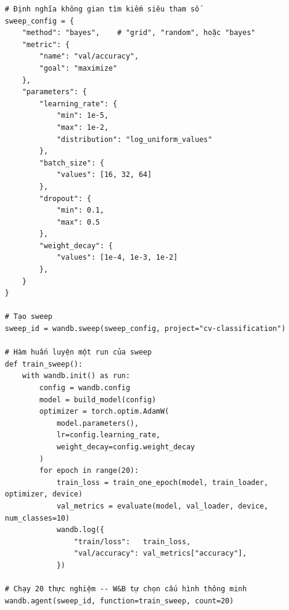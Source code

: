 \begin{verbatim}
# Định nghĩa không gian tìm kiếm siêu tham số
sweep_config = {
    "method": "bayes",    # "grid", "random", hoặc "bayes"
    "metric": {
        "name": "val/accuracy",
        "goal": "maximize"
    },
    "parameters": {
        "learning_rate": {
            "min": 1e-5,
            "max": 1e-2,
            "distribution": "log_uniform_values"
        },
        "batch_size": {
            "values": [16, 32, 64]
        },
        "dropout": {
            "min": 0.1,
            "max": 0.5
        },
        "weight_decay": {
            "values": [1e-4, 1e-3, 1e-2]
        },
    }
}

# Tạo sweep
sweep_id = wandb.sweep(sweep_config, project="cv-classification")

# Hàm huấn luyện một run của sweep
def train_sweep():
    with wandb.init() as run:
        config = wandb.config
        model = build_model(config)
        optimizer = torch.optim.AdamW(
            model.parameters(),
            lr=config.learning_rate,
            weight_decay=config.weight_decay
        )
        for epoch in range(20):
            train_loss = train_one_epoch(model, train_loader, optimizer, device)
            val_metrics = evaluate(model, val_loader, device, num_classes=10)
            wandb.log({
                "train/loss":   train_loss,
                "val/accuracy": val_metrics["accuracy"],
            })

# Chạy 20 thực nghiệm -- W&B tự chọn cấu hình thông minh
wandb.agent(sweep_id, function=train_sweep, count=20)
\end{verbatim}

